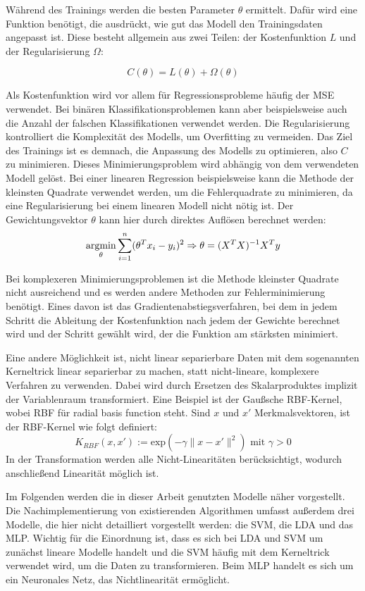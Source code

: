 		Während des Trainings werden die besten Parameter $\theta$ ermittelt. Dafür wird eine Funktion benötigt, die ausdrückt, wie gut das Modell den Trainingsdaten angepasst ist. Diese besteht allgemein aus zwei Teilen: der Kostenfunktion $L$ und der Regularisierung $\Omega$:
		
		\[
			C(\theta)= L(\theta) + \Omega(\theta)
		\]
		
		Als Kostenfunktion wird vor allem für Regressionsprobleme häufig der \ac{MSE} verwendet. Bei binären Klassifikationsproblemen kann aber beispielsweise auch die Anzahl der falschen Klassifikationen verwendet werden. Die Regularisierung kontrolliert die Komplexität des Modells, um Overfitting zu vermeiden. Das Ziel des Trainings ist es demnach, die Anpassung des Modells zu optimieren, also $C$ zu minimieren. Dieses Minimierungsproblem wird abhängig von dem verwendeten Modell gelöst. Bei einer linearen Regression beispielsweise kann die Methode der kleinsten Quadrate verwendet werden, um die Fehlerquadrate zu minimieren, da eine Regularisierung bei einem linearen Modell nicht nötig ist. Der Gewichtungsvektor $\theta$ kann hier durch direktes Auflösen berechnet werden:
		\[
			\operatorname*{argmin}_{\theta} \sum_{i=1}^{n} (\theta^T x_i - y_i)^2
			\Rightarrow \theta = (X^T X)^{-1} X^Ty
		\]
		
		Bei komplexeren Minimierungsproblemen ist die Methode kleinster Quadrate nicht ausreichend und es werden andere Methoden zur Fehlerminimierung benötigt. Eines davon ist das Gradientenabstiegsverfahren, bei dem in jedem Schritt die Ableitung der Kostenfunktion nach jedem der Gewichte berechnet wird und der Schritt gewählt wird, der die Funktion am stärksten minimiert.
		
		Eine andere Möglichkeit ist, nicht linear separierbare Daten mit dem sogenannten Kerneltrick linear separierbar zu machen, statt nicht-lineare, komplexere Verfahren zu verwenden. Dabei wird durch Ersetzen des Skalarproduktes implizit der Variablenraum transformiert. Eine Beispiel ist der Gaußsche RBF-Kernel, wobei RBF für radial basis function steht. Sind $x$ und $x'$ Merkmalsvektoren, ist der RBF-Kernel wie folgt definiert:
		\[
			K_{RBF} (x, x\prime) := \text{exp}(-\gamma \|x - x\prime\|^2) \text{ mit } \gamma > 0
		\]
		In der Transformation werden alle Nicht-Linearitäten berücksichtigt, wodurch anschließend Linearität möglich ist. %
		
		Im Folgenden werden die in dieser Arbeit genutzten Modelle näher vorgestellt. Die Nachimplementierung von existierenden Algorithmen umfasst außerdem drei Modelle, die hier nicht detailliert vorgestellt werden: die \ac{SVM}, die \ac{LDA} und das \ac{MLP}. Wichtig für die Einordnung ist, dass es sich bei \ac{LDA} und \ac{SVM} um zunächst lineare Modelle handelt und die \ac{SVM} häufig mit dem Kerneltrick verwendet wird, um die Daten zu transformieren. Beim \ac{MLP} handelt es sich um ein Neuronales Netz, das Nichtlinearität ermöglicht.

